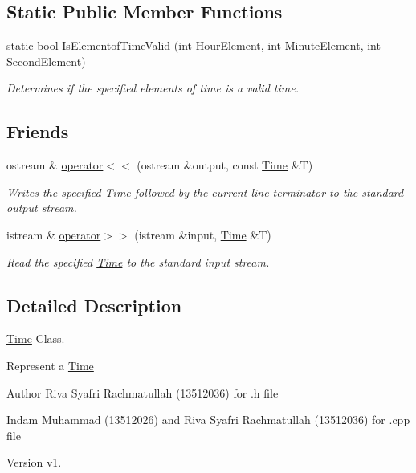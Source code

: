 \subsection*{Static Public Member Functions}
\begin{DoxyCompactItemize}
\item 
static bool \hyperlink{class_time_a73518dd61e22a29dded0c808a746e6be}{Is\-Elementof\-Time\-Valid} (int Hour\-Element, int Minute\-Element, int Second\-Element)
\begin{DoxyCompactList}\small\item\em Determines if the specified elements of time is a valid time. \end{DoxyCompactList}\end{DoxyCompactItemize}
\subsection*{Friends}
\begin{DoxyCompactItemize}
\item 
ostream \& \hyperlink{class_time_af7462b6d18ba08745290b681487bed88}{operator$<$$<$} (ostream \&output, const \hyperlink{class_time}{Time} \&T)
\begin{DoxyCompactList}\small\item\em Writes the specified \hyperlink{class_time}{Time} followed by the current line terminator to the standard output stream. \end{DoxyCompactList}\item 
istream \& \hyperlink{class_time_af8dde22bf0e747b2b3525ff7b8d648f4}{operator$>$$>$} (istream \&input, \hyperlink{class_time}{Time} \&T)
\begin{DoxyCompactList}\small\item\em Read the specified \hyperlink{class_time}{Time} to the standard input stream. \end{DoxyCompactList}\end{DoxyCompactItemize}


\subsection{Detailed Description}
\hyperlink{class_time}{Time} Class. 

Represent a \hyperlink{class_time}{Time}

\begin{DoxyAuthor}{Author}
Riva Syafri Rachmatullah (13512036) for .h file 

Indam Muhammad (13512026) and Riva Syafri Rachmatullah (13512036) for .cpp file
\end{DoxyAuthor}
\begin{DoxyVersion}{Version}
v1. 
\end{DoxyVersion}



